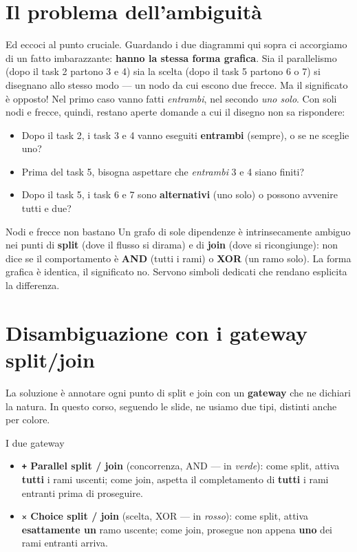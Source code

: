 \section{\texorpdfstring{Il problema dell'ambiguità}{Il problema dell'ambiguità}}

Ed eccoci al punto cruciale. Guardando i due diagrammi qui sopra ci accorgiamo di un fatto imbarazzante: \textbf{hanno la stessa forma grafica}. Sia il parallelismo (dopo il task 2 partono 3 e 4) sia la scelta (dopo il task 5 partono 6 o 7) si disegnano allo stesso modo — un nodo da cui escono due frecce. Ma il significato è opposto! Nel primo caso vanno fatti \emph{entrambi}, nel secondo \emph{uno solo}. Con soli nodi e frecce, quindi, restano aperte domande a cui il disegno non sa rispondere:

\begin{itemize}
\item Dopo il task 2, i task 3 e 4 vanno eseguiti \textbf{entrambi} (sempre), o se ne sceglie uno?
\item Prima del task 5, bisogna aspettare che \emph{entrambi} 3 e 4 siano finiti?
\item Dopo il task 5, i task 6 e 7 sono \textbf{alternativi} (uno solo) o possono avvenire tutti e due?
\end{itemize}

\begin{boxwarning}{Nodi e frecce non bastano}
Un grafo di sole dipendenze è intrinsecamente ambiguo nei punti di \textbf{split} (dove il flusso si dirama) e di \textbf{join} (dove si ricongiunge): non dice se il comportamento è \textbf{AND} (tutti i rami) o \textbf{XOR} (un ramo solo). La forma grafica è identica, il significato no. Servono simboli dedicati che rendano esplicita la differenza.
\end{boxwarning}

\section{\texorpdfstring{Disambiguazione con i gateway split/join}{Disambiguazione con i gateway split/join}}

La soluzione è annotare ogni punto di split e join con un \textbf{gateway} che ne dichiari la natura. In questo corso, seguendo le slide, ne usiamo due tipi, distinti anche per colore.

\begin{boxdefinition}{I due gateway}
\begin{itemize}
\item \textbf{\texttt{+} Parallel split / join} (concorrenza, AND — in \emph{verde}): come split, attiva \textbf{tutti} i rami uscenti; come join, aspetta il completamento di \textbf{tutti} i rami entranti prima di proseguire.
\item \textbf{\texttt{✕} Choice split / join} (scelta, XOR — in \emph{rosso}): come split, attiva \textbf{esattamente un} ramo uscente; come join, prosegue non appena \textbf{uno} dei rami entranti arriva.
\end{itemize}
\end{boxdefinition}

